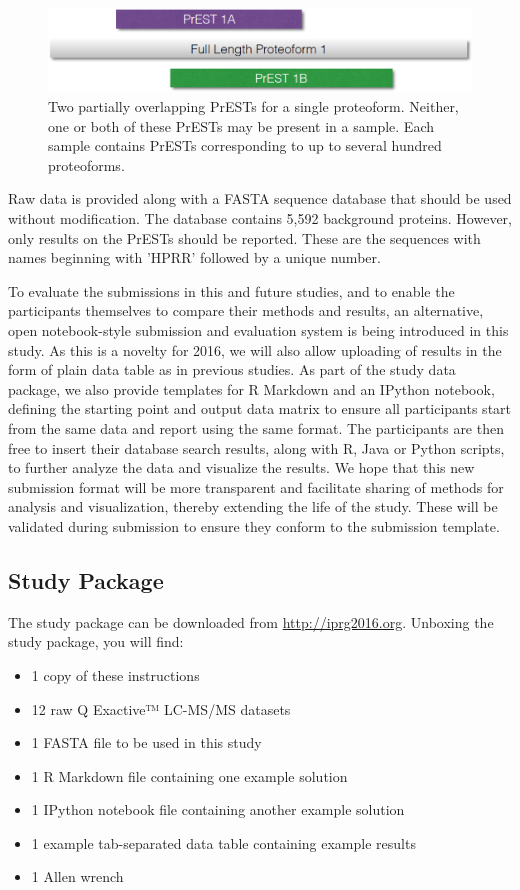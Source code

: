 \documentclass[a4paper,12pt]{article}
\begin{document}
\begin{figure}[h]
\includegraphics[width=13cm]{Figure_2}
\centering
\caption{Two partially overlapping PrESTs for a single proteoform. Neither, one or both of these PrESTs may be present in a sample. Each sample contains PrESTs corresponding to up to several hundred proteoforms.}
\end{figure}

Raw data is provided along with a FASTA sequence database that should be used without modification. The database contains 5,592 background proteins. However, only results on the PrESTs should be reported. These are the sequences with names beginning with 'HPRR' followed by a unique number.

To evaluate the submissions in this and future studies, and to enable the participants themselves to compare their methods and results, an alternative, open notebook-style submission and evaluation system is being introduced in this study. As this is a novelty for 2016, we will also allow uploading of results in the form of plain data table as in previous studies. As part of the study data package, we also provide templates for R Markdown and an IPython notebook, defining the starting point and output data matrix to ensure all participants start from the same data and report using the same format. The participants are then free to insert their database search results, along with R, Java or Python scripts, to further analyze the data and visualize the results. We hope that this new submission format will be more transparent and facilitate sharing of methods for analysis and visualization, thereby extending the life of the study. These will be validated during submission to ensure they conform to the submission template.

\subsection*{Study Package}
The study package can be downloaded from \url{http://iprg2016.org}. Unboxing the study package, you will find:
\begin{itemize}
\item1 copy of these instructions
\item12 raw Q Exactive™ LC-MS/MS datasets
\item1 FASTA file to be used in this study
\item1 R Markdown file containing one example solution
\item1 IPython notebook file containing another example solution
\item1 example tab-separated data table containing example results
\item1 Allen wrench
\end{itemize}
\end{document}
